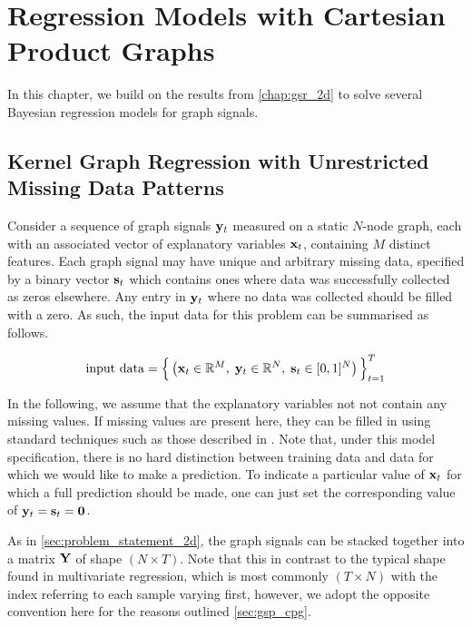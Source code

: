 \chapter{Regression Models with Cartesian Product Graphs}


\label{chap:kgr_rnc_2d}

In this chapter, we build on the results from \cref{chap:gsr_2d} to solve several Bayesian regression models for graph signals. 


\section{Kernel Graph Regression with Unrestricted Missing Data Patterns}

\label{sec:kgr_mdp}

Consider a sequence of graph signals $\mathbf{y}_t$ measured on a static $N$-node graph, each with an associated vector of explanatory variables $\mathbf{x}_t$, containing $M$ distinct features. Each graph signal may have unique and arbitrary missing data, specified by a binary vector $\mathbf{s}_t$ which contains ones where data was successfully collected as zeros elsewhere. Any entry in $\mathbf{y}_t$ where no data was collected should be filled with a zero. As such, the input data for this problem can be summarised as follows. 

\begin{equation}
    \text{input data} = \Big\{\left(\mathbf{x}_t \in \mathbb{R}^{M}, \; \mathbf{y}_t \in \mathbb{R}^{N}, \; \mathbf{s}_t \in [0, 1]^{N} \right)\Big\}_{t=1}^T
\end{equation}

 In the following, we assume that the explanatory variables not not contain any missing values. If missing values are present here, they can be filled in using standard techniques such as those described in \cite{Little2019}. Note that, under this model specification, there is no hard distinction between training data and data for which we would like to make a prediction. To indicate a particular value of $\mathbf{x}_t$ for which a full prediction should be made, one can just set the corresponding value of $\mathbf{y}_t = \mathbf{s}_t = \mathbf{0}$. 

As in \cref{sec:problem_statement_2d}, the graph signals can be stacked together into a matrix $\mathbf{Y}$ of shape $(N \times T)$. Note that this in contrast to the typical shape found in multivariate regression, which is most commonly $(T \times N)$ with the index referring to each sample varying first, however, we adopt the opposite convention here for the reasons outlined \cref{sec:gsp_cpg}. 

